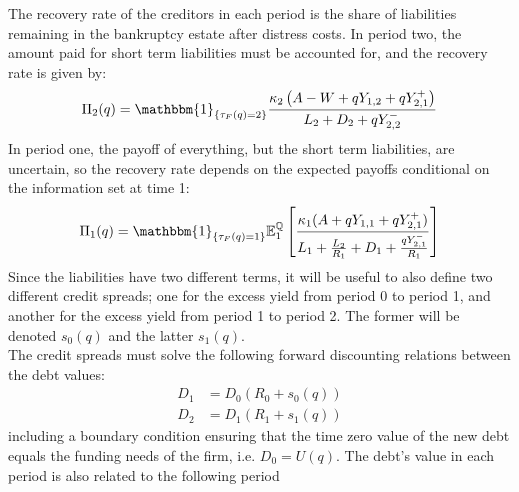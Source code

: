\documentclass[main.tex]{subfiles}
\begin{document}
        The recovery rate of the creditors in each period
        is the share of liabilities remaining in the bankruptcy estate after distress costs.
        In period two, the amount paid for short term liabilities must be accounted for,
        and the recovery rate is given by:
        \begin{align*}
            \Pi_{2}(q) 
            = 
            \mathbbm{1}_{\{\tau_{F}(q)=2\}}
            \frac{
                \kappa_2 \left(
                A - W + q Y_{1,2} + q Y_{2,1}^{+}
                \right)
            }{
                L_{2}
                +
                D_{2}
                +
                q Y_{2,2}^{-} 
            }
        \end{align*}
        In period one, the payoff of everything, but the short term liabilities, are uncertain,
        so the recovery rate depends on the expected payoffs
        conditional on the information set at time 1:
        \begin{align*}
            \Pi_{1}(q) 
            = 
            \mathbbm{1}_{\{\tau_{F}(q)=1\}}
            \mathbb{E}_{1}^{\rnmeasure}\left[
                \frac{
                    \kappa_1
                    (A + q Y_{1,1} + q Y_{2,1}^{+})
                }{
                    L_{1}
                    +
                    \frac{L_{2}}{R_{1}}
                    +
                    D_{1}
                    +
                    \frac{q Y_{2,1}^{-}}{R_{1}}
                }
            \right] 
        \end{align*}
        Since the liabilities have two different terms, 
        it will be useful to also define two different credit spreads;
        one for the excess yield from period 0 to period 1,
        and another for the excess yield from period 1 to period 2.
        The former will be denoted $s_{0}(q)$ and the latter $s_{1}(q)$.
        \\
        The credit spreads must solve the following forward discounting relations
        between the debt values:
        \begin{align*}
            D_{1} 
            &= 
            D_{0}(R_{0} + s_{0}(q)) 
            \nonumber \\
            D_{2} 
            &= 
            D_{1}(R_{1} + s_{1}(q))
            \nonumber 
        \end{align*}
        including a boundary condition ensuring that the time zero value of the new debt 
        equals the funding needs of the firm, i.e. $D_{0} = U(q)$.
        The debt's value in each period is also related to the following period 
\end{document}

